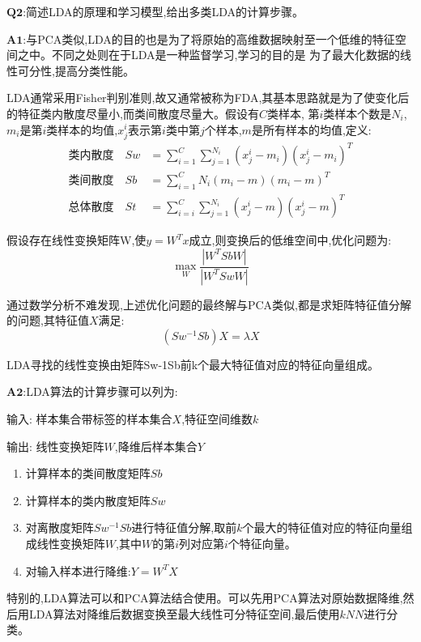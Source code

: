 \documentclass[homework]{IEEEtran}
\begin{document}
\begin{CJK}{UTF8}{gkai}
$\mathbf{Q2}$:简述LDA的原理和学习模型,给出多类LDA的计算步骤。\par
$\mathbf{A1}$:与PCA类似,LDA的目的也是为了将原始的高维数据映射至一个低维的特征空间之中。不同之处则在于LDA是一种监督学习,学习的目的是
为了最大化数据的线性可分性,提高分类性能。\par
LDA通常采用Fisher判别准则,故又通常被称为FDA,其基本思路就是为了使变化后的特征类内散度尽量小,而类间散度尽量大。假设有$C$类样本,
第$i$类样本个数是$N_{i}$,$m_{i}$是第$i$类样本的均值,$x_{j}^{i}$表示第$i$类中第$j$个样本,$m$是所有样本的均值,定义:
\begin{align*}
\text{类内散度}  \quad S w &=\sum_{i=1}^{C} \sum_{j=1}^{N_{i}}\left(x_{j}^{i}-m_{i}\right)\left(x_{j}^{i}-m_{i}\right)^{T} \\
\text{类间散度}  \quad S b &=\sum_{i=1}^{C} N_{i}\left(m_{i}-m\right)\left(m_{i}-m\right)^{T} \\
\text{总体散度}  \quad S t &=\sum_{i=i}^{C} \sum_{j=1}^{N_{i}}\left(x_{j}^{i}-m\right)\left(x_{j}^{i}-m\right)^{T} 
\end{align*} \par
假设存在线性变换矩阵W,使$y=W^Tx$成立,则变换后的低维空间中,优化问题为:
$$
\max _{W} \frac{\left|W^{T} S b W\right|}{\left|W^{T} S w W\right|}
$$ \par
通过数学分析不难发现,上述优化问题的最终解与PCA类似,都是求矩阵特征值分解的问题,其特征值$X$满足:
$$
\left(S w^{-1} S b\right) X=\lambda X
$$ \par
LDA寻找的线性变换由矩阵Sw-1Sb前k个最大特征值对应的特征向量组成。 \par
$\mathbf{A2}$:LDA算法的计算步骤可以列为: \par
输入: 样本集合带标签的样本集合$X$,特征空间维数$k$ \par
输出: 线性变换矩阵$W$,降维后样本集合$Y$ \par
\begin{enumerate}
\item 计算样本的类间散度矩阵$Sb$
\item 计算样本的类内散度矩阵$Sw$
\item 对离散度矩阵$Sw^{-1}Sb$进行特征值分解,取前$k$个最大的特征值对应的特征向量组成线性变换矩阵$W$,其中$W$的第$i$列对应第$i$个特征向量。
\item 对输入样本进行降维:$Y=W^TX$
\end{enumerate} \par
特别的,LDA算法可以和PCA算法结合使用。可以先用PCA算法对原始数据降维,然后用LDA算法对降维后数据变换至最大线性可分特征空间,最后使用$kNN$进行分类。 \par

\end{CJK}
\end{document}
